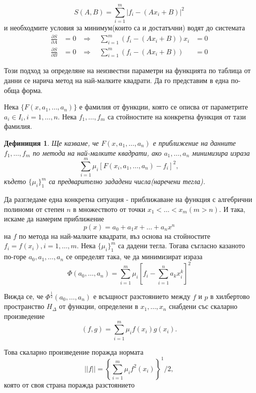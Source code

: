 \documentclass[12pt]{article}
\numberwithin{equation}{section}
\newtheorem{definition}{Дефиниция}
\numberwithin{theorem}{section}
\numberwithin{definition}{section}
\numberwithin{corollary}{section}
\begin{document}
\[
S(A,B) = \displaystyle\sum_{i=1}^m|f_i - (Ax_i +B)|^2
\]
и необходмите условия за минимум(които са и достатъчни) водят до системата
\begin{align*}
\frac{\partial S}{\partial A} &= 0 &\Rightarrow\hspace{12pt}
                                \displaystyle\sum_{i=1}^m(f_i - (Ax_i+B))x_i &=0\\
\frac{\partial S}{\partial B} &= 0 &\Rightarrow\hspace{12pt}
                                \displaystyle\sum_{i=1}^m(f_i - (Ax_i+B)) &=0
\end{align*}
\par
Този подход за определяне на неизвестни параметри на функцията по таблица от данни се нарича метод на най-малките квадрати. Да го представим в една по-обща форма.
\par
Нека $\{F(x,a_1,\dotso, a_n)\}$ е фамилия от функции, която се описва от параметрите $a_i\in I_i, i=1,\dotso, n$. Нека $f_1,\dotso, f_m$ са стойностите на конкретна функция от тази фамилия.
\begin{definition}
Ще казваме, че $F(x,a_1,\dotso,a_n)$ е приближение на данните $f_1,\dotso, f_m$ по метода на най-малките квадрати, ако $a_1,\dotso, a_n$ минимизира израза
\[
\displaystyle\sum_{i=1}^m\mu_i[F(x_i, a_1,\dotso, a_n)-f_i]^2,
\]
където $\{\mu_i\}_1^m$ са предварително зададени числа(наречени тегла).
\end{definition}
\par
Да разгледаме една конкретна ситуация - приближаване на функция с алгебрични полиноми от степен $n$ в множеството от точки $x_1<\dotso<x_m (m>n)$. И така, искаме да намерим приближение
\[
p(x) = a_0+a_1x+\dotso+a_nx^n
\]
на $f$ по метода на най-малките квадрати, въз основа на стойностите $f_i = f(x_i), i = 1, \dotso, m$. Нека $\{\mu_i\}_1^m$ са дадени тегла. Тогава съгласно казаното по-горе $a_0, a_1,\dotso,a_n$ се определят така, че да минимизират израза
\[
\Phi(a_0,\dotso,a_n) = \displaystyle\sum_{i=1}^m\mu_i[f_i - \displaystyle\sum_{i=1}^na_kx_i^k]^2
\]
\par
Вижда се, че $\Phi^{\frac{1}{2}}(a_0,\dotso,a_n)$ е всъщност разстоянието между $f$ и $p$ в хилбертово пространство $H_\Delta$ от функции, определени в $x_1,\dotso,x_n$ снабдени със скаларно произведение
\[
(f,g) = \displaystyle\sum_{i=1}^m\mu_if(x_i)g(x_i).
\]
\par
Това скаларно произведение поражда нормата
\[
||f|| = \left\{\displaystyle\sum_{i=1}^m\mu_if^2(x_i)\right\}^1/2,
\]
която от своя страна поражда разстоянието
\end{document}
